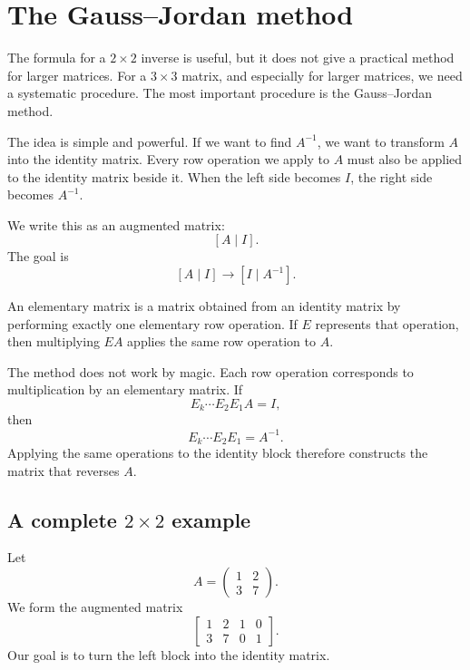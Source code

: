 \section{The Gauss--Jordan method}

The formula for a \(2\times2\) inverse is useful, but it does not give a practical method for larger matrices. For a \(3\times3\) matrix, and especially for larger matrices, we need a systematic procedure. The most important procedure is the Gauss--Jordan method.

The idea is simple and powerful. If we want to find \(A^{-1}\), we want to transform \(A\) into the identity matrix. Every row operation we apply to \(A\) must also be applied to the identity matrix beside it. When the left side becomes \(I\), the right side becomes \(A^{-1}\).

We write this as an augmented matrix:
\[
[A\mid I].
\]
The goal is
\[
[A\mid I] \longrightarrow [I\mid A^{-1}].
\]

\begin{definitionbox}
An elementary matrix is a matrix obtained from an identity matrix by performing exactly one elementary row operation. If \(E\) represents that operation, then multiplying \(EA\) applies the same row operation to \(A\).
\end{definitionbox}

\begin{remarkbox}
The method does not work by magic. Each row operation corresponds to multiplication by an elementary matrix. If
\[
E_k\cdots E_2E_1A=I,
\]
then
\[
E_k\cdots E_2E_1=A^{-1}.
\]
Applying the same operations to the identity block therefore constructs the matrix that reverses \(A\).
\end{remarkbox}

\subsection{A complete \(2\times2\) example}

Let
\[
A=\begin{pmatrix}1&2\\3&7\end{pmatrix}.
\]
We form the augmented matrix
\[
\left[\begin{array}{cc|cc}
1&2&1&0\\
3&7&0&1
\end{array}\right].
\]
Our goal is to turn the left block into the identity matrix.

